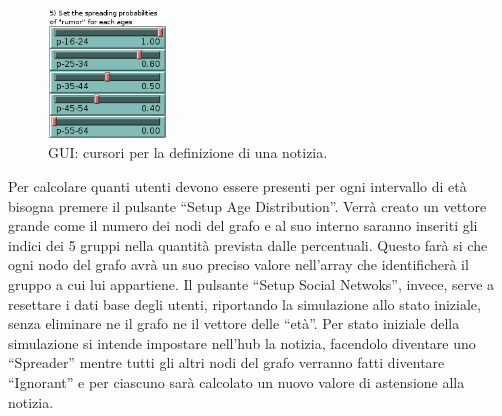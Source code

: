 \begin{figure}
  \vspace*{-20pt}
  \begin{center}
    \includegraphics[width=0.28\textwidth]{img/gui-news.png}
  \end{center}
 \vspace*{-10pt}
 \caption{GUI: 
 cursori per la definizione di una notizia.}
 \vspace*{-10pt}
 \label{img:gui_news}
\end{figure}
Per calcolare quanti utenti devono essere presenti per ogni intervallo di età bisogna premere il pulsante ``Setup Age Distribution''.
Verrà creato un vettore grande come il numero dei nodi del grafo e al suo interno saranno inseriti gli indici dei 5 gruppi nella 
quantità prevista dalle percentuali. Questo farà si che ogni nodo del grafo avrà un suo preciso valore nell'array che identificherà il gruppo
a cui lui appartiene.
Il pulsante ``Setup Social Netwoks'', invece, serve a resettare i dati base degli utenti, riportando la simulazione 
allo stato iniziale, senza eliminare ne il grafo ne il vettore delle ``età''.
Per stato iniziale della simulazione si intende impostare nell'hub la notizia, facendolo diventare uno ``Spreader'' mentre 
tutti gli altri nodi del grafo verranno fatti diventare ``Ignorant'' e per ciascuno sarà calcolato un nuovo valore di 
astensione alla notizia.

